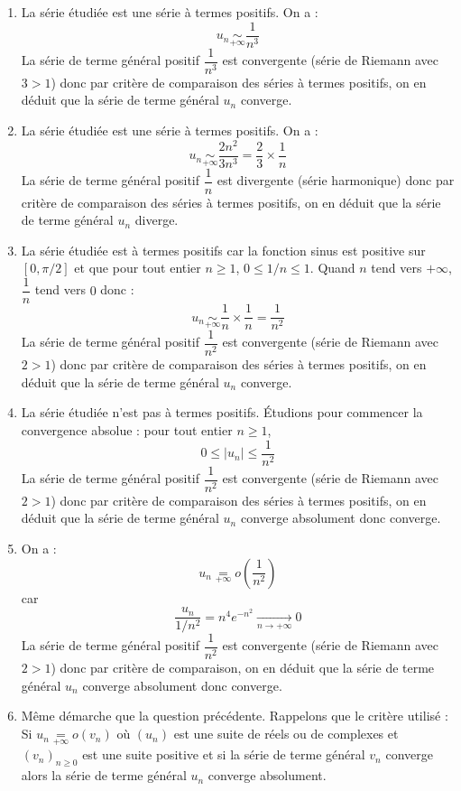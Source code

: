 \documentclass[a4paper,twoside,french,11pt]{VcCours}
\begin{document}
\begin{enumerate}
\item La série étudiée est une série à termes positifs. On a :
$$ u_n \underset{+ \infty}{\sim} \dfrac{1}{n^3}$$
La série de terme général positif $\dfrac{1}{n^3}$ est convergente (série de Riemann avec $3>1$) donc par critère de comparaison des séries à termes positifs, on en déduit que la série de terme général $u_n$ converge.

\item La série étudiée est une série à termes positifs. On a :
$$ u_n \underset{+ \infty}{\sim} \dfrac{2n^2}{3n^3} = \dfrac{2}{3} \times \dfrac{1}{n}$$
La série de terme général positif $\dfrac{1}{n}$ est divergente (série harmonique) donc par critère de comparaison des séries à termes positifs, on en déduit que la série de terme général $u_n$ diverge.
\item La série étudiée est à termes positifs car la fonction sinus est positive sur $[0, \pi/2]$ et que pour tout entier $n \geq 1$, $0 \leq 1/n \leq 1$. Quand $n$ tend vers $+ \infty$, $\dfrac{1}{n}$ tend vers $0$ donc :
$$  u_n \underset{+ \infty}{\sim} \dfrac{1}{n} \times \dfrac{1}{n} = \dfrac{1}{n^2}$$
La série de terme général positif $\dfrac{1}{n^2}$ est convergente (série de Riemann avec $2>1$) donc par critère de comparaison des séries à termes positifs, on en déduit que la série de terme général $u_n$ converge.
\item La série étudiée n'est pas à termes positifs. Étudions pour commencer la convergence absolue : pour tout entier $n \geq 1$,
$$ 0 \leq \vert u_n \vert \leq \dfrac{1}{n^2}$$
La série de terme général positif $\dfrac{1}{n^2}$ est convergente (série de Riemann avec $2>1$) donc par critère de comparaison des séries à termes positifs, on en déduit que la série de terme général $u_n$ converge absolument donc converge.
\item On a :
$$ u_n \underset{+ \infty}{=} o  \left( \dfrac{1}{n^2} \right)$$
car 
$$ \dfrac{u_n}{1/n^2} = n^4 e^{-n^2} \underset{n \rightarrow + \infty}{\longrightarrow} 0$$
La série de terme général positif $\dfrac{1}{n^2}$ est convergente (série de Riemann avec $2>1$) donc par critère de comparaison, on en déduit que la série de terme général $u_n$ converge absolument donc converge.
\item Même démarche que la question précédente. Rappelons que le critère utilisé : Si $u_n \underset{+ \infty}{=} o(v_n)$ où $(u_n)$ est une suite de réels ou de complexes et $(v_n)_{n \geq 0}$ est une suite positive et si la série de terme général $v_n$ converge alors la série de terme général $u_n$ converge absolument.
\end{enumerate}
\end{document}
